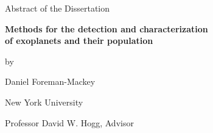 \documentclass[12pt,letterpaper]{article}
\newcommand{\thesistitle}{Methods for the detection and characterization \\
                          of exoplanets and their population}
\newcommand{\thesisauthor}{Daniel Foreman-Mackey}
\newcommand{\thesisadvisor}{Professor David W. Hogg}
\begin{document}
  \begin{center}
    Abstract of the Dissertation\bigskip

    \textbf{\thesistitle}\bigskip

    by\bigskip

    \thesisauthor\bigskip

    New York University\bigskip

    \thesisadvisor, Advisor
  \end{center}
\bigskip


\end{document}
